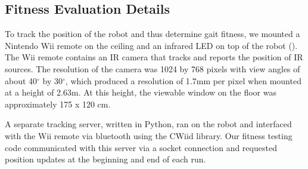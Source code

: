 \subsection{Fitness Evaluation Details}

%
%
%
%
%
%



To track the position of the robot and thus determine gait fitness, we
mounted a Nintendo Wii remote on the ceiling and an infrared LED on
top of the robot ().  The Wii remote contains
an IR camera that tracks and reports the position of IR sources.  The resolution of the camera was 1024 by
768 pixels with view angles of about 40$^\circ$ by 30$^\circ$, which
produced a resolution of 1.7mm per pixel when mounted at a height of
2.63m.  At this height, the viewable window on the floor was
approximately 175 x 120 cm.

A separate tracking server, written in Python, ran on the robot and
interfaced with the Wii remote via bluetooth using the CWiid
library\cite{cwiid}.  Our fitness testing code communicated with this
server via a socket connection and requested position updates at the
beginning and end of each run.



